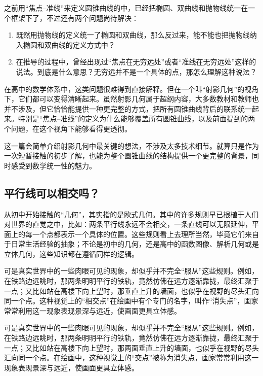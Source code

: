 
\begin{issues}
\issueDraft
\end{issues}


之前用“焦点–准线”来定义圆锥曲线的中，已经把椭圆、双曲线和抛物线统一在一个框架下了，不过还有两个问题尚待解决：
\begin{enumerate}
\item 既然用抛物线的定义统一了椭圆和双曲线，那么反过来，能不能也把抛物线纳入椭圆和双曲线的定义方式中？
\item 在推导的过程中，曾经出现过“焦点在无穷远处”或者“准线在无穷远处”这样的说法。到底是什么意思？无穷远并不是一个具体的点，那怎么理解这种说法？
\end{enumerate}

在高中的数学体系中，这类问题很难得到直接解释。但在一个叫“射影几何”的视角下，它们都可以变得清晰起来。虽然射影几何属于超纲内容，大多数教材和教师也并不涉及，但它恰恰能提供一种更完整的方式，把所有圆锥曲线背后的联系统一起来。特别是“焦点–准线”的定义为什么能够覆盖所有圆锥曲线，以及前面提到的两个问题，在这个视角下能够看得更透彻。

这一篇会简单介绍射影几何中最关键的想法，不涉及太多技术细节。就算只是作为一次短暂接触的初步了解，也能为整个圆锥曲线的结构提供一个更完整的背景，同时感受到数学统一性的魅力。

\subsection{平行线可以相交吗？}

从初中开始接触的“几何”，其实指的是欧式几何。其中的许多规则早已根植于人们对世界的直觉之中，比如：两条平行线永远不会相交，一条直线可以无限延伸，平面上的每一个点都表示一个具体的位置。这些规则看上去理所当然，毕竟它们来自于日常生活经验的抽象；不论是初中的几何，还是高中的函数图像、解析几何或是立体几何，这些知识都在遵循同样的逻辑。

可是真实世界中的一些肉眼可见的现象，却似乎并不完全“服从”这些规则。例如，在铁路边远眺时，那两条明明平行的铁轨，竟然仿佛在远方逐渐靠拢，最终汇聚于一点；又比如站在高楼下向上望时，那垂直上升的墙面，也似乎在视野的尽头汇向同一个点。这种视觉上的“相交点”在绘画中有个专门的名字，叫作“消失点”，画家常常利用这一现象表现景深与远近，使画面更具立体感。

可是真实世界中的一些肉眼可见的现象，却似乎并不完全“服从”这些规则。例如，在铁路边远眺时，那两条明明平行的铁轨，竟然仿佛在远方逐渐靠拢，最终汇聚于一点；又比如站在高楼下向上望时，那两面垂直上升的墙面，也似乎在视野的尽头汇向同一个点。在绘画中，这种视觉上的“交点”被称为消失点，画家常常利用这一现象表现景深与远近，使画面更具立体感。

